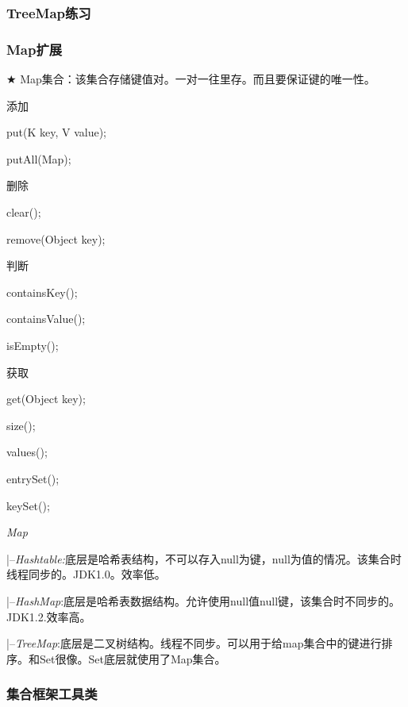 \documentclass[UTF8]{ctexart}
\begin{document}
\subsubsection{TreeMap练习}


\subsubsection{Map扩展}
$\bigstar$ Map集合：该集合存储键值对。一对一往里存。而且要保证键的唯一性。

\qquad \textbullet 添加

\qquad \qquad put(K key, V value);

\qquad \qquad putAll(Map);

\qquad \textbullet 删除

\qquad \qquad clear();

\qquad \qquad remove(Object key);

\qquad \textbullet 判断

\qquad \qquad containsKey();

\qquad \qquad containsValue();

\qquad \qquad isEmpty();

\qquad \textbullet 获取

\qquad \qquad get(Object key);

\qquad \qquad size();

\qquad \qquad values();

\qquad \qquad entrySet();

\qquad \qquad keySet();

\em{Map}

\qquad |--\textit{Hashtable:}底层是哈希表结构，不可以存入null为键，null为值的情况。该集合时线程同步的。JDK1.0。效率低。

\qquad |--\textit{HashMap}:底层是哈希表数据结构。允许使用null值null键，该集合时不同步的。JDK1.2.效率高。

\qquad |--\textit{TreeMap}:底层是二叉树结构。线程不同步。可以用于给map集合中的键进行排序。和Set很像。Set底层就使用了Map集合。



\subsubsection{集合框架工具类}

\end{document}
